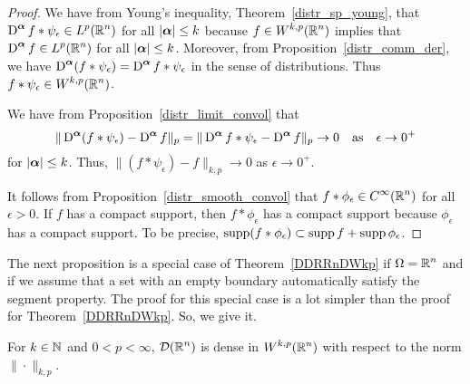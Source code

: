 \begin{proof}
We have from Young's inequality,
Theorem~\ref{distr_sp_young}, that
$\displaystyle \operatorname{D}^{{\bm{\alpha}}} f \ast \psi_\epsilon \in L^p(\mathbb{R}^n)$ for all
$|{\bm{\alpha}}|\leq k$ because $\displaystyle f \in W^{k,p}(\mathbb{R}^n)$ implies that
$\displaystyle \operatorname{D}^{{\bm{\alpha}}} f \in L^p(\mathbb{R}^n)$ for all
$|{\bm{\alpha}}|\leq k$.
Moreover, from Proposition~\ref{distr_comm_der}, we have
$\displaystyle \operatorname{D}^{{\bm{\alpha}}}(f \ast \psi_\epsilon) = \operatorname{D}^{{\bm{\alpha}}} f
\ast \psi_\epsilon$ in the sense of distributions.  Thus
$\displaystyle f \ast \psi_\epsilon \in W^{k,p}(\mathbb{R}^n)$.

We have from Proposition~\ref{distr_limit_convol} that
\[
\| \operatorname{D}^{{\bm{\alpha}}}(f \ast \psi_\epsilon) - \operatorname{D}^{{\bm{\alpha}}} f \|_{p}
= \| \operatorname{D}^{{\bm{\alpha}}} f \ast \psi_\epsilon - \operatorname{D}^{{\bm{\alpha}}} f \|_{p}
\rightarrow 0 \quad \text{as}\quad \epsilon \rightarrow 0^+
\]
for $|{\bm{\alpha}}|\leq k$.  Thus,
$\displaystyle \| (f \ast \psi_\epsilon) - f \|_{k,p} \rightarrow 0$
as $\epsilon \rightarrow 0^+$.

It follows from Proposition~\ref{distr_smooth_convol} that
$\displaystyle f \ast \phi_{\epsilon} \in C^\infty(\mathbb{R}^n)$ for all $\epsilon>0$.
If $f$ has a compact support, then $f \ast \phi_{\epsilon}$ has a
compact support because $\phi_\epsilon$ has a compact support.  To be
precise,
$\operatorname{supp} (f \ast \phi_{\epsilon}) \subset \operatorname{supp} f + \operatorname{supp} \phi_{\epsilon}$.
\end{proof}

The next proposition is a special case of Theorem~\ref{DDRRnDWkp} if
$\displaystyle \Omega = \mathbb{R}^n$ and if we assume that a set with an
empty boundary automatically satisfy the segment property.  The proof
for this special case is a lot simpler than the proof for
Theorem~\ref{DDRRnDWkp}.  So, we give it.

\begin{prop} \label{DDRRnDWkpV2}
For $k\in \mathbb{N}$ and $0 < p < \infty$, $\displaystyle \mathcal{D}(\mathbb{R}^n)$ is dense in
$\displaystyle W^{k,p}(\mathbb{R}^n)$ with respect to the norm $\|\cdot\|_{k,p}$.
\end{prop}

